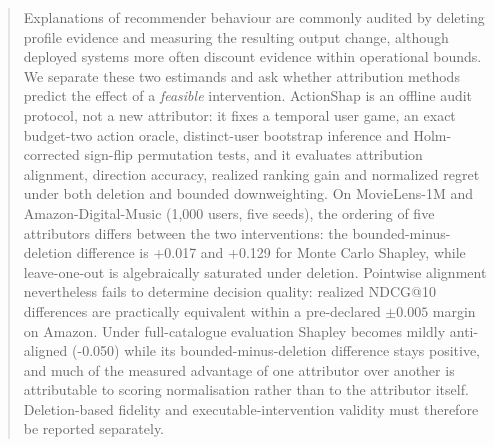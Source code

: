 \begin{abstract}
Explanations of recommender behaviour are commonly audited by deleting profile evidence and measuring the resulting output change, although deployed systems more often discount evidence within operational bounds. We separate these two estimands and ask whether attribution methods predict the effect of a \emph{feasible} intervention. ActionShap is an offline audit protocol, not a new attributor: it fixes a temporal user game, an exact budget-two action oracle, distinct-user bootstrap inference and Holm-corrected sign-flip permutation tests, and it evaluates attribution alignment, direction accuracy, realized ranking gain and normalized regret under both deletion and bounded downweighting. On MovieLens-1M and Amazon-Digital-Music (1,000 users, five seeds), the ordering of five attributors differs between the two interventions: the bounded-minus-deletion difference is +0.017 and +0.129 for Monte Carlo Shapley, while leave-one-out is algebraically saturated under deletion. Pointwise alignment nevertheless fails to determine decision quality: realized NDCG@10 differences are practically equivalent within a pre-declared $\pm0.005$ margin on Amazon. Under full-catalogue evaluation Shapley becomes mildly anti-aligned (-0.050) while its bounded-minus-deletion difference stays positive, and much of the measured advantage of one attributor over another is attributable to scoring normalisation rather than to the attributor itself. Deletion-based fidelity and executable-intervention validity must therefore be reported separately.
\end{abstract}
